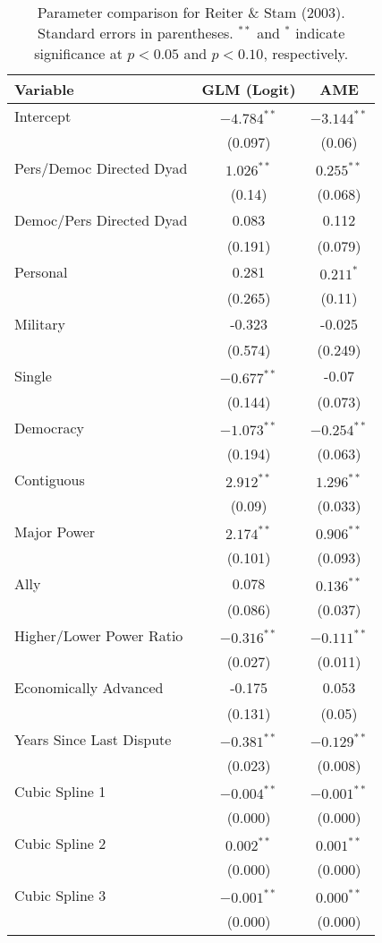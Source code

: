 \begin{table}[ht]
\centering
\begingroup\normalsize
\begin{tabular}{lcc}
 Variable & GLM (Logit) & AME \\ 
  \hline
\hline
Intercept & $-4.784^{\ast\ast}$ & $-3.144^{\ast\ast}$ \\ 
   & (0.097) & (0.06) \\ 
  Pers/Democ Directed Dyad & $1.026^{\ast\ast}$ & $0.255^{\ast\ast}$ \\ 
   & (0.14) & (0.068) \\ 
  Democ/Pers Directed Dyad & 0.083 & 0.112 \\ 
   & (0.191) & (0.079) \\ 
  Personal & 0.281 & $0.211^{\ast}$ \\ 
   & (0.265) & (0.11) \\ 
  Military & -0.323 & -0.025 \\ 
   & (0.574) & (0.249) \\ 
  Single & $-0.677^{\ast\ast}$ & -0.07 \\ 
   & (0.144) & (0.073) \\ 
  Democracy & $-1.073^{\ast\ast}$ & $-0.254^{\ast\ast}$ \\ 
   & (0.194) & (0.063) \\ 
  Contiguous & $2.912^{\ast\ast}$ & $1.296^{\ast\ast}$ \\ 
   & (0.09) & (0.033) \\ 
  Major Power & $2.174^{\ast\ast}$ & $0.906^{\ast\ast}$ \\ 
   & (0.101) & (0.093) \\ 
  Ally & 0.078 & $0.136^{\ast\ast}$ \\ 
   & (0.086) & (0.037) \\ 
  Higher/Lower Power Ratio & $-0.316^{\ast\ast}$ & $-0.111^{\ast\ast}$ \\ 
   & (0.027) & (0.011) \\ 
  Economically Advanced & -0.175 & 0.053 \\ 
   & (0.131) & (0.05) \\ 
  Years Since Last Dispute & $-0.381^{\ast\ast}$ & $-0.129^{\ast\ast}$ \\ 
   & (0.023) & (0.008) \\ 
  Cubic Spline 1 & $-0.004^{\ast\ast}$ & $-0.001^{\ast\ast}$ \\ 
   & (0.000) & (0.000) \\ 
  Cubic Spline 2 & $0.002^{\ast\ast}$ & $0.001^{\ast\ast}$ \\ 
   & (0.000) & (0.000) \\ 
  Cubic Spline 3 & $-0.001^{\ast\ast}$ & $0.000^{\ast\ast}$ \\ 
   & (0.000) & (0.000) \\ 
   \hline
\hline
\end{tabular}
\endgroup
\caption{Parameter comparison for Reiter \& Stam (2003). Standard errors in parentheses. $^{**}$ and $^{*}$ indicate significance at $p<0.05$ and $p<0.10$, respectively.} 
\label{tab:reiter_stam_coef}
\end{table}
